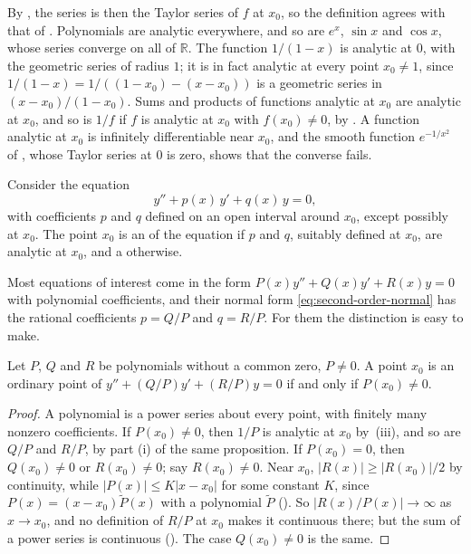 By , the series is then the Taylor series of $f$ at $x_0$, so the definition agrees with that of . Polynomials are analytic everywhere, and so are $e^x$, $\sin x$ and $\cos x$, whose series converge on all of $\mathbb R$. The function $1/(1-x)$ is analytic at $0$, with the geometric series of radius $1$; it is in fact analytic at every point $x_0\ne1$, since $1/(1-x)=1/((1-x_0)-(x-x_0))$ is a geometric series in $(x-x_0)/(1-x_0)$. Sums and products of functions analytic at $x_0$ are analytic at $x_0$, and so is $1/f$ if $f$ is analytic at $x_0$ with $f(x_0)\ne0$, by . A function analytic at $x_0$ is infinitely differentiable near $x_0$, and the smooth function $e^{-1/x^2}$ of , whose Taylor series at $0$ is zero, shows that the converse fails.

\begin{definition}
\label{def:ordinary-point}
Consider the equation
\begin{equation}
y''+p(x)\,y'+q(x)\,y=0 ,
\label{eq:second-order-normal}
\end{equation}
with coefficients $p$ and $q$ defined on an open interval around $x_0$, except possibly at $x_0$. The point $x_0$ is an  of the equation if $p$ and $q$, suitably defined at $x_0$, are analytic at $x_0$, and a  otherwise.
\end{definition}

Most equations of interest come in the form $P(x)y''+Q(x)y'+R(x)y=0$ with polynomial coefficients, and their normal form \eqref{eq:second-order-normal} has the rational coefficients $p=Q/P$ and $q=R/P$. For them the distinction is easy to make.

\begin{proposition}
\label{prop:polynomial-ordinary}
Let $P$, $Q$ and $R$ be polynomials without a common zero, $P\ne0$. A point $x_0$ is an ordinary point of $y''+(Q/P)y'+(R/P)y=0$ if and only if $P(x_0)\ne0$.
\end{proposition}

\begin{proof}
A polynomial is a power series about every point, with finitely many nonzero coefficients. If $P(x_0)\ne0$, then $1/P$ is analytic at $x_0$ by \,(iii), and so are $Q/P$ and $R/P$, by part (i) of the same proposition. If $P(x_0)=0$, then $Q(x_0)\ne0$ or $R(x_0)\ne0$; say $R(x_0)\ne0$. Near $x_0$, $|R(x)|\ge|R(x_0)|/2$ by continuity, while $|P(x)|\le K|x-x_0|$ for some constant $K$, since $P(x)=(x-x_0)\tilde P(x)$ with a polynomial $\tilde P$ (). So $|R(x)/P(x)|\to\infty$ as $x\to x_0$, and no definition of $R/P$ at $x_0$ makes it continuous there; but the sum of a power series is continuous (). The case $Q(x_0)\ne0$ is the same.
\end{proof}

